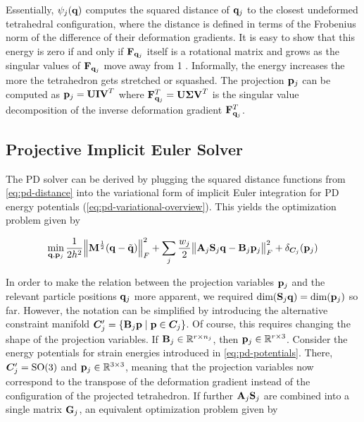 \noindent Essentially, $\psi_j(\mathbf{q})$ computes the squared distance of $\mathbf{q}_j$ to the closest undeformed tetrahedral configuration, 
where the distance is defined in terms of the Frobenius norm of the difference of their deformation gradients. It is easy to 
show that this energy is zero if and only if $\mathbf{F}_{\mathbf{q}_j}$ itself is a rotational matrix and grows as the 
singular values of $\mathbf{F}_{\mathbf{q}_j}$ move away from 1 \cite{bouaziz2014}. Informally, the energy increases the more the tetrahedron gets 
stretched or squashed. The projection $\mathbf{p}_j$ can be computed as $\mathbf{p}_j = \mathbf{UIV}^T$ where $\mathbf{F}^T_{\mathbf{q}_j} = 
\mathbf{U \Sigma V}^T$ is the singular value decomposition of the inverse deformation gradient $\mathbf{F}^T_{\mathbf{q}_j}$.

\subsection{Projective Implicit Euler Solver}\label{ss:pd-solver}
The PD solver can be derived by plugging the squared distance functions from \autoref{eq:pd-distance} into the variational 
form of implicit
Euler integration for PD energy potentials (\cref{eq:pd-variational-overview}). This yields the optimization problem given by 

\begin{equation}\label{eq:pd-variational}
    \min_{\mathbf{q}, \mathbf{p}_j} \frac{1}{2h^2} \norm{\mathbf{M}^{\frac{1}{2}}(\mathbf{q} - \tilde{\mathbf{q}})}^2_F + 
    \sum_j \frac{w_j}{2} \norm{\mathbf{A}_j\mathbf{S}_j\mathbf{q} - \mathbf{B}_j\mathbf{p}_j}^2_F + \delta_{\bm{C}_j}(\mathbf{p}_j)
\end{equation}

\noindent In order to make the relation between the projection variables $\mathbf{p}_j$ and the relevant particle positions 
$\mathbf{q}_j$ more apparent, we required $\text{dim}(\mathbf{S}_j\mathbf{q}) = \text{dim}(\mathbf{p}_j)$ so far. However, the 
notation can be simplified by introducing the alternative constraint manifold $\bm{C}^\prime_j = \{ \mathbf{B}_j\mathbf{p} 
\mid \mathbf{p} \in \bm{C}_j \}$. Of course, this requires changing the shape of the projection variables. If 
$\mathbf{B}_j \in \mathbb{R}^{r \times n_j}$, then $\mathbf{p}_j \in \mathbb{R}^{r \times 3}$. Consider the energy 
potentials for strain energies introduced in \cref{eq:pd-potentials}. There, $\bm{C}^\prime_j = \text{SO}(3)$ 
and $\mathbf{p}_j \in \mathbb{R}^{3 \times 3}$, meaning that the projection variables now correspond to the transpose 
of the deformation gradient 
instead of the configuration of the projected tetrahedron. If further $\mathbf{A}_j\mathbf{S}_j$ are combined into a single 
matrix $\mathbf{G}_j$, an equivalent optimization problem given by 

